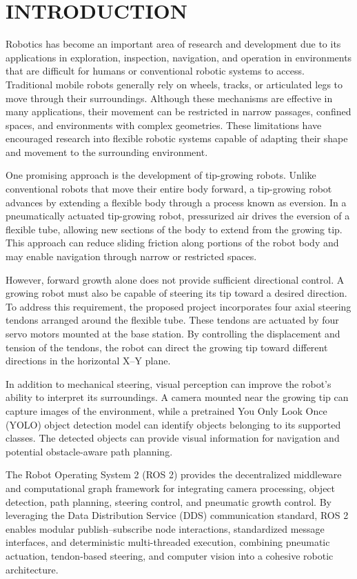 \chapter{INTRODUCTION}

Robotics has become an important area of research and development due to its applications in exploration, inspection, navigation, and operation in environments that are difficult for humans or conventional robotic systems to access. Traditional mobile robots generally rely on wheels, tracks, or articulated legs to move through their surroundings. Although these mechanisms are effective in many applications, their movement can be restricted in narrow passages, confined spaces, and environments with complex geometries. These limitations have encouraged research into flexible robotic systems capable of adapting their shape and movement to the surrounding environment.

One promising approach is the development of tip-growing robots. Unlike conventional robots that move their entire body forward, a tip-growing robot advances by extending a flexible body through a process known as eversion. In a pneumatically actuated tip-growing robot, pressurized air drives the eversion of a flexible tube, allowing new sections of the body to extend from the growing tip. This approach can reduce sliding friction along portions of the robot body and may enable navigation through narrow or restricted spaces.

However, forward growth alone does not provide sufficient directional control. A growing robot must also be capable of steering its tip toward a desired direction. To address this requirement, the proposed project incorporates four axial steering tendons arranged around the flexible tube. These tendons are actuated by four servo motors mounted at the base station. By controlling the displacement and tension of the tendons, the robot can direct the growing tip toward different directions in the horizontal X--Y plane.

In addition to mechanical steering, visual perception can improve the robot's ability to interpret its surroundings. A camera mounted near the growing tip can capture images of the environment, while a pretrained You Only Look Once (YOLO) object detection model can identify objects belonging to its supported classes. The detected objects can provide visual information for navigation and potential obstacle-aware path planning.

The Robot Operating System 2 (ROS 2) provides the decentralized middleware and computational graph framework for integrating camera processing, object detection, path planning, steering control, and pneumatic growth control. By leveraging the Data Distribution Service (DDS) communication standard, ROS 2 enables modular publish--subscribe node interactions, standardized message interfaces, and deterministic multi-threaded execution, combining pneumatic actuation, tendon-based steering, and computer vision into a cohesive robotic architecture.

